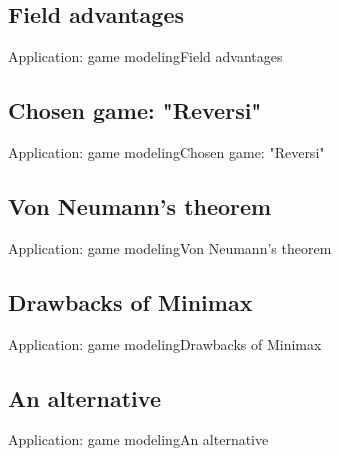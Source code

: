 \subsection{Field advantages}
\begin{frame}{Application: game modeling}{Field advantages}
\end{frame}

\subsection{Chosen game: "Reversi"}
\begin{frame}{Application: game modeling}{Chosen game: "Reversi"}
\end{frame}

\subsection{Von Neumann's theorem}
\begin{frame}{Application: game modeling}{Von Neumann's theorem}
\end{frame}

\subsection{Drawbacks of Minimax}
\begin{frame}{Application: game modeling}{Drawbacks of Minimax}
\end{frame}

\subsection{An alternative}
\begin{frame}{Application: game modeling}{An alternative}
\end{frame}
